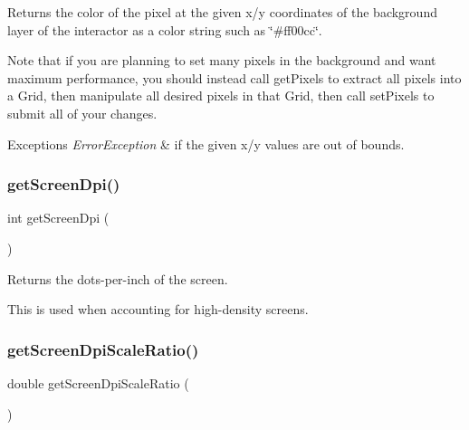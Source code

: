 Returns the color of the pixel at the given x/y coordinates of the background layer of the interactor as a color string such as \char`\"{}\#ff00cc\char`\"{}. 

Note that if you are planning to set many pixels in the background and want maximum performance, you should instead call get\+Pixels to extract all pixels into a Grid, then manipulate all desired pixels in that Grid, then call set\+Pixels to submit all of your changes.


\begin{DoxyExceptions}{Exceptions}
{\em Error\+Exception} & if the given x/y values are out of bounds. \\
\hline
\end{DoxyExceptions}
\mbox{\label{classGWindow_aea783b75281f864f14e958d2fee28f9d}} 
\subsubsection{\texorpdfstring{get\+Screen\+Dpi()}{getScreenDpi()}}
{\footnotesize\ttfamily int get\+Screen\+Dpi (\begin{DoxyParamCaption}{ }\end{DoxyParamCaption})\hspace{0.3cm}{\ttfamily [static]}}



Returns the dots-\/per-\/inch of the screen. 

This is used when accounting for high-\/density screens. \mbox{\label{classGWindow_ab15179b683630109f0ac256590a3b323}} 
\subsubsection{\texorpdfstring{get\+Screen\+Dpi\+Scale\+Ratio()}{getScreenDpiScaleRatio()}}
{\footnotesize\ttfamily double get\+Screen\+Dpi\+Scale\+Ratio (\begin{DoxyParamCaption}{ }\end{DoxyParamCaption})\hspace{0.3cm}{\ttfamily [static]}}



